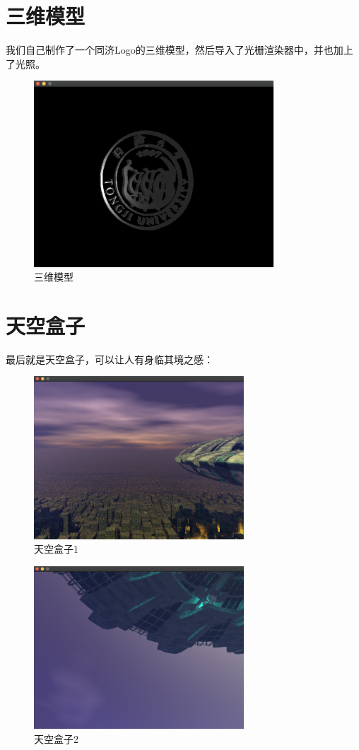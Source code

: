     \section{三维模型}
    我们自己制作了一个同济Logo的三维模型，然后导入了光栅渲染器中，并也加上了光照。
            \begin{figure}[H]
    	\centering
		\includegraphics[width=0.8\textwidth]{images/demo8.png}
		\caption{三维模型}
		\label{demo8}
    \end{figure} 
    
    \section{天空盒子}
    最后就是天空盒子，可以让人有身临其境之感：
            \begin{figure}[H]
    	\centering
		\includegraphics[width=0.7\textwidth]{images/demo9.png}
		\caption{天空盒子1}
		\label{demo9}
    \end{figure} 
    
                \begin{figure}[H]
    	\centering
		\includegraphics[width=0.7\textwidth]{images/demo10.png}
		\caption{天空盒子2}
		\label{demo10}
    \end{figure} 

